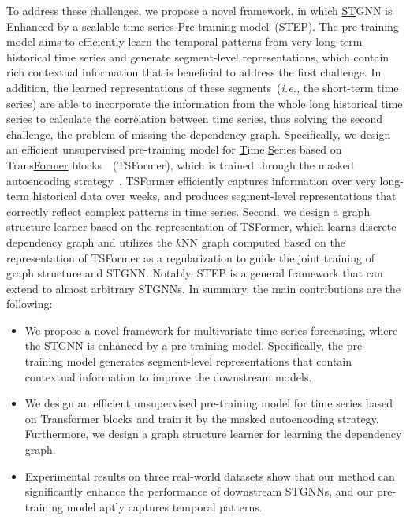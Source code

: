 \documentclass[sigconf]{acmart}
\newcommand{\ie}{\textit{i.e.,}\xspace}
\begin{document}
To address these challenges, we propose a novel framework, in which \underline{S}\underline{T}GNN is \underline{E}nhanced by a scalable time series \underline{P}re-training model~(STEP).
The pre-training model aims to efficiently learn the temporal patterns from very long-term historical time series and generate segment-level representations, which contain rich contextual information that is beneficial to address the first challenge.
In addition, the learned representations of these segments~(\ie the short-term time series) are able to incorporate the information from the whole long historical time series to calculate the correlation between time series, thus solving the second challenge, the problem of missing the dependency graph.
Specifically, we design an efficient unsupervised pre-training model for \underline{T}ime \underline{S}eries based on Trans\underline{Former} blocks~\cite{2017Transformer}~(TSFormer), which is trained through the masked autoencoding strategy~\cite{2021MAE}.
TSFormer efficiently captures information over very long-term historical data over weeks, and produces segment-level representations that correctly reflect complex patterns in time series.
Second, we design a graph structure learner based on the representation of TSFormer, which learns discrete dependency graph and utilizes the $k$NN graph computed based on the representation of TSFormer as a regularization to guide the joint training of graph structure and STGNN.
Notably, STEP is a general framework that can extend to almost arbitrary STGNNs.
In summary, the main contributions are the following:
\begin{itemize}
    \item We propose a novel framework for multivariate time series forecasting, where the STGNN is enhanced by a pre-training model.
    Specifically, the pre-training model generates segment-level representations that contain contextual information to improve the downstream models.
    \item We design an efficient unsupervised pre-training model for time series based on Transformer blocks and train it by the masked autoencoding strategy. 
Furthermore, we design a graph structure learner for learning the dependency graph.
    \item Experimental results on three real-world datasets show that our method can significantly enhance the performance of downstream STGNNs, and our pre-training model aptly captures temporal patterns.
\end{itemize}
\end{document}
